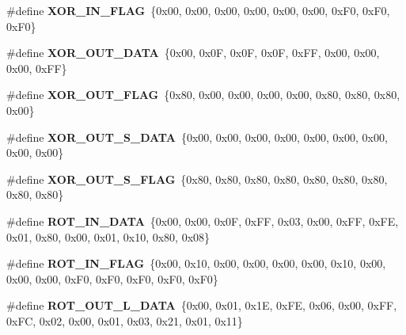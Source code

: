 \begin{DoxyCompactItemize}
\item 
\mbox{\label{unit-test-cpu-dispatch_8c_a4d9de72822427608084ba877dcecae5b}} 
\#define {\bfseries X\+O\+R\+\_\+\+I\+N\+\_\+\+F\+L\+AG}~\{0x00, 0x00, 0x00, 0x00, 0x00, 0x00, 0x\+F0, 0x\+F0, 0x\+F0\}
\item 
\mbox{\label{unit-test-cpu-dispatch_8c_ae7d6b97fb63c54791fb3de16701c2168}} 
\#define {\bfseries X\+O\+R\+\_\+\+O\+U\+T\+\_\+\+D\+A\+TA}~\{0x00, 0x0\+F, 0x0\+F, 0x0\+F, 0x\+F\+F, 0x00, 0x00, 0x00, 0x\+F\+F\}
\item 
\mbox{\label{unit-test-cpu-dispatch_8c_a01fad358e64ca1597ded327ef58cc30b}} 
\#define {\bfseries X\+O\+R\+\_\+\+O\+U\+T\+\_\+\+F\+L\+AG}~\{0x80, 0x00, 0x00, 0x00, 0x00, 0x80, 0x80, 0x80, 0x00\}
\item 
\mbox{\label{unit-test-cpu-dispatch_8c_ac4500fb0f0123f1a7ec3267d445b22a5}} 
\#define {\bfseries X\+O\+R\+\_\+\+O\+U\+T\+\_\+\+S\+\_\+\+D\+A\+TA}~\{0x00, 0x00, 0x00, 0x00, 0x00, 0x00, 0x00, 0x00, 0x00\}
\item 
\mbox{\label{unit-test-cpu-dispatch_8c_aace6814daf7c1e2bb92a78926a9b9e37}} 
\#define {\bfseries X\+O\+R\+\_\+\+O\+U\+T\+\_\+\+S\+\_\+\+F\+L\+AG}~\{0x80, 0x80, 0x80, 0x80, 0x80, 0x80, 0x80, 0x80, 0x80\}
\item 
\mbox{\label{unit-test-cpu-dispatch_8c_a1b1bad255c4f1d4fc220e0994155f2d6}} 
\#define {\bfseries R\+O\+T\+\_\+\+I\+N\+\_\+\+D\+A\+TA}~\{0x00, 0x00, 0x0\+F, 0x\+F\+F, 0x03, 0x00, 0x\+F\+F, 0x\+F\+E, 0x01, 0x80, 0x00, 0x01, 0x10, 0x80, 0x08\}
\item 
\mbox{\label{unit-test-cpu-dispatch_8c_a4a419f873e751b8a08366aac14e2be05}} 
\#define {\bfseries R\+O\+T\+\_\+\+I\+N\+\_\+\+F\+L\+AG}~\{0x00, 0x10, 0x00, 0x00, 0x00, 0x00, 0x10, 0x00, 0x00, 0x00, 0x\+F0, 0x\+F0, 0x\+F0, 0x\+F0, 0x\+F0\}
\item 
\mbox{\label{unit-test-cpu-dispatch_8c_a177b320d65490cc2a7eec4bf91f01e53}} 
\#define {\bfseries R\+O\+T\+\_\+\+O\+U\+T\+\_\+\+L\+\_\+\+D\+A\+TA}~\{0x00, 0x01, 0x1\+E, 0x\+F\+E, 0x06, 0x00, 0x\+F\+F, 0x\+F\+C, 0x02, 0x00, 0x01, 0x03, 0x21, 0x01, 0x11\}

\end{DoxyCompactItemize}
